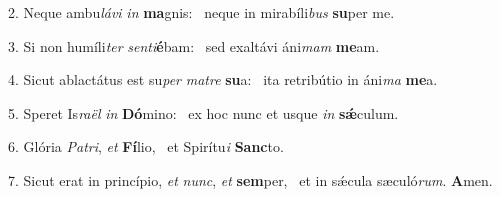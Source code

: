 2. Neque ambu\textit{lá}\textit{vi} \textit{in} \textbf{ma}gnis: \ast\  neque in mirabíli\textit{bus} \textbf{su}per me.\

3. Si non humíli\textit{ter} \textit{sen}\textit{ti}\textbf{é}bam: \ast\  sed exaltávi áni\textit{mam} \textbf{me}am.\

4. Sicut ablactátus est su\textit{per} \textit{ma}\textit{tre} \textbf{su}a: \ast\  ita retribútio in áni\textit{ma} \textbf{me}a.\

5. Speret Is\textit{ra}\textit{ël} \textit{in} \textbf{Dó}mino: \ast\  ex hoc nunc et usque \textit{in} \textbf{sǽ}culum.\

6. Glória \textit{Pa}\textit{tri}, \textit{et} \textbf{Fí}lio, \ast\  et Spirítu\textit{i} \textbf{Sanc}to.\

7. Sicut erat in princípio, \textit{et} \textit{nunc}, \textit{et} \textbf{sem}per, \ast\  et in sǽcula sæculó\textit{rum}. \textbf{A}men.\

